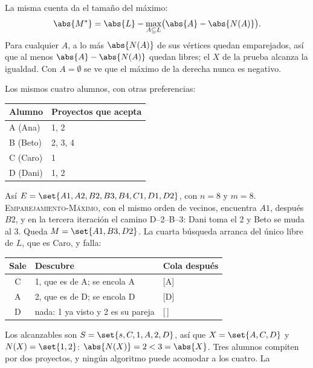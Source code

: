 \documentclass[11pt,letterpaper]{article}
\begin{document}
\begin{observacion}
  La misma cuenta da el tamaño del máximo:
  \[
    \abs{M^*} = \abs{L} - \max_{A \subseteq L}
                \bigl(\abs{A} - \abs{N(A)}\bigr) .
  \]
  Para cualquier $A$, a lo más $\abs{N(A)}$ de sus vértices quedan
  emparejados, así que al menos $\abs{A} - \abs{N(A)}$ quedan libres;
  el $X$ de la prueba alcanza la igualdad. Con $A = \emptyset$ se ve
  que el máximo de la derecha nunca es negativo.
\end{observacion}

\begin{ejemplo}
  \label{ej:emparejamiento-hall}
  Los mismos cuatro alumnos, con otras preferencias:
  \begin{center}
  \small
  \begin{tabular}{ll}
    \toprule
    \textbf{Alumno} & \textbf{Proyectos que acepta} \\
    \midrule
    A (Ana) & 1, 2 \\
    B (Beto) & 2, 3, 4 \\
    C (Caro) & 1 \\
    D (Dani) & 1, 2 \\
    \bottomrule
  \end{tabular}
  \end{center}
  Así $E = \set{A1, A2, B2, B3, B4, C1, D1, D2}$, con $n = 8$ y
  $m = 8$. \textsc{Emparejamiento-Máximo}, con el mismo orden de
  vecinos, encuentra $A1$, después $B2$, y en la tercera iteración el
  camino D--2--B--3: Dani toma el 2 y Beto se muda al 3. Queda
  $M = \set{A1, B3, D2}$. La cuarta búsqueda arranca del único libre
  de $L$, que es Caro, y falla:
  \begin{center}
  \small
  \begin{tabular}{cll}
    \toprule
    \textbf{Sale} & \textbf{Descubre} & \textbf{Cola después} \\
    \midrule
    C & 1, que es de A; se encola A & [A] \\
    A & 2, que es de D; se encola D & [D] \\
    D & nada: 1 ya visto y 2 es su pareja & [\,] \\
    \bottomrule
  \end{tabular}
  \end{center}
  Los alcanzables son $S = \set{s, C, 1, A, 2, D}$, así que
  $X = \set{A, C, D}$ y $N(X) = \set{1, 2}$:
  $\abs{N(X)} = 2 < 3 = \abs{X}$. Tres alumnos compiten por dos
  proyectos, y ningún algoritmo puede acomodar a los cuatro. La

\end{ejemplo}
\end{document}
